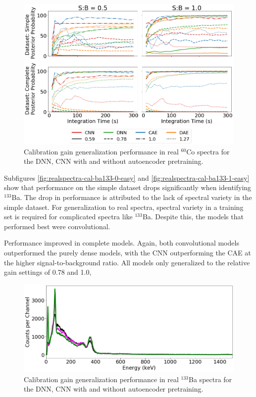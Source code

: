 \begin{figure}[H]
	\centering
	\includegraphics[width=1.0\linewidth]{images/realspectra-cal-co60}
	\caption{Calibration gain generalization performance in real $^{60}$Co spectra for the DNN, CNN with and without autoencoder pretraining.}
	\label{fig:realspectra-cal-co60}
\end{figure}

Subfigures \ref{fig:realspectra-cal-ba133-0-easy} and \ref{fig:realspectra-cal-ba133-1-easy} show that performance on the simple dataset drops significantly when identifying $^{133}$Ba. The drop in performance is attributed to the lack of spectral variety in the simple dataset. For generalization to real spectra, spectral variety in a training set is required for complicated spectra like $^{133}$Ba. Despite this, the models that performed best were convolutional.

Performance improved in complete models. Again, both convolutional models outperformed the purely dense models, with the CNN outperforming the CAE at the higher signal-to-background ratio. All models only generalized to the relative gain settings of 0.78 and 1.0,  


\begin{figure}[H]
	\centering
	\includegraphics[width=1.0\linewidth]{images/realspectra-cal-ba133}
	\caption{Calibration gain generalization performance in real $^{133}$Ba spectra for the DNN, CNN with and without autoencoder pretraining.}
	\label{fig:realspectra-cal-ba133}
\end{figure}


